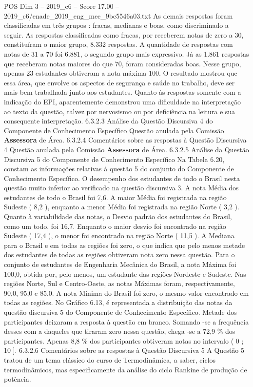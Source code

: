 \begin{textsample}{POS Dim 3 – 2019\_c6 – Score 17.00 – 2019\_c6/enade\_2019\_eng\_mec\_9be5546a03.txt}
As demais respostas foram classificadas em três grupos : fracas, medianas e boas, como discriminado a seguir.
As respostas classificadas como fracas, por receberem notas de zero a 30, constituíram o maior grupo, 8.332 respostas.
A quantidade de respostas com notas de 31 a 70 foi 6.881, o segundo grupo mais expressivo.
Já as 1.861 respostas que receberam notas maiores do que 70, foram consideradas boas.
Nesse grupo, apenas 23 estudantes obtiveram a nota máxima 100.
O resultado mostrou que essa área, que envolve os aspectos de segurança e saúde no trabalho, deve ser mais bem trabalhada junto aos estudantes.
Quanto às respostas somente com a indicação do EPI, aparentemente demonstrou uma dificuldade na interpretação ao texto da questão, talvez por nervosismo ou por deficiência na leitura e sua consequente interpretação. 6.3.2.3 Análise da Questão Discursiva 4 do Componente de Conhecimento Específico Questão anulada pela Comissão \textbf{Assessora} de Área. 6.3.2.4 Comentários sobre as respostas à Questão Discursiva 4 Questão anulada pela Comissão \textbf{Assessora} de Área. 6.3.2.5 Análise da Questão Discursiva 5 do Componente de Conhecimento Específico Na Tabela 6.20, constam as informações relativas à questão 5 do conjunto do Componente de Conhecimento Específico.
O desempenho dos estudantes de todo o Brasil nesta questão muito inferior ao verificado na questão discursiva 3.
A nota Média dos estudantes de todo o Brasil foi 7,6.
A maior Média foi registrada na região Sudeste ( 8,2 ), enquanto a menor Média foi registrada na região Norte ( 3,2 ).
Quanto à variabilidade das notas, o Desvio padrão dos estudantes do Brasil, como um todo, foi 16,7.
Enquanto o maior desvio foi encontrado na região Sudeste ( 17,4 ), o menor foi encontrado na região Norte ( 11,5 ).
A Mediana para o Brasil e em todas as regiões foi zero, o que indica que pelo menos metade dos estudantes de todas as regiões obtiveram nota zero nessa questão.
Para o conjunto de estudantes de Engenharia Mecânica do Brasil, a nota Máxima foi 100,0, obtida por, pelo menos, um estudante das regiões Nordeste e Sudeste.
Nas regiões Norte, Sul e Centro-Oeste, as notas Máximas foram, respectivamente, 90,0, 95,0 e 85,0.
A nota Mínima do Brasil foi zero, o mesmo valor encontrado em todas as regiões.
No Gráfico 6.13, é representada a distribuição das notas da questão discursiva 5 do Componente de Conhecimento Específico.
Metade dos participantes deixaram a resposta à questão em branco.
Somando -se a frequência desses com a daqueles que tiraram zero nessa questão, chega -se a 72,9 \% dos participantes.
Apenas 8,8 \% dos participantes obtiveram notas no intervalo ( 0 ; 10 ]. 6.3.2.6 Comentários sobre as respostas à Questão Discursiva 5 A Questão 5 tratou de um tema clássico do curso de Termodinâmica, a saber, ciclos termodinâmicos, mas especificamente da análise do ciclo Rankine de produção de potência.

\end{textsample}
